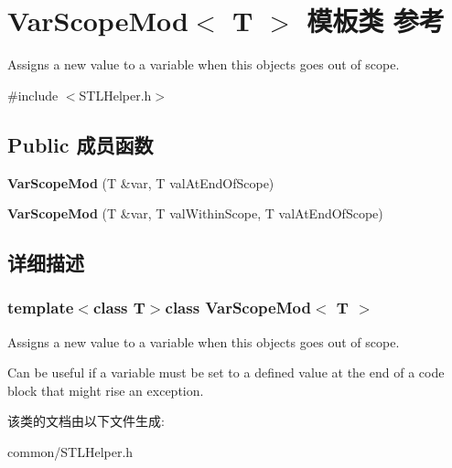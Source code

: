 \hypertarget{class_var_scope_mod}{\section{Var\+Scope\+Mod$<$ T $>$ 模板类 参考}
\label{class_var_scope_mod}
}


Assigns a new value to a variable when this objects goes out of scope.  




{\ttfamily \#include $<$S\+T\+L\+Helper.\+h$>$}

\subsection*{Public 成员函数}
\begin{DoxyCompactItemize}
\item 
\hypertarget{class_var_scope_mod_a82755753b47f01e3442a368ce138a94f}{{\bfseries Var\+Scope\+Mod} (T \&var, T val\+At\+End\+Of\+Scope)}\label{class_var_scope_mod_a82755753b47f01e3442a368ce138a94f}

\item 
\hypertarget{class_var_scope_mod_a75a6f730114b4b2c641f2d980943817a}{{\bfseries Var\+Scope\+Mod} (T \&var, T val\+Within\+Scope, T val\+At\+End\+Of\+Scope)}\label{class_var_scope_mod_a75a6f730114b4b2c641f2d980943817a}

\end{DoxyCompactItemize}


\subsection{详细描述}
\subsubsection*{template$<$class T$>$class Var\+Scope\+Mod$<$ T $>$}

Assigns a new value to a variable when this objects goes out of scope. 

Can be useful if a variable must be set to a defined value at the end of a code block that might rise an exception. 

该类的文档由以下文件生成\+:\begin{DoxyCompactItemize}
\item 
common/S\+T\+L\+Helper.\+h\end{DoxyCompactItemize}
